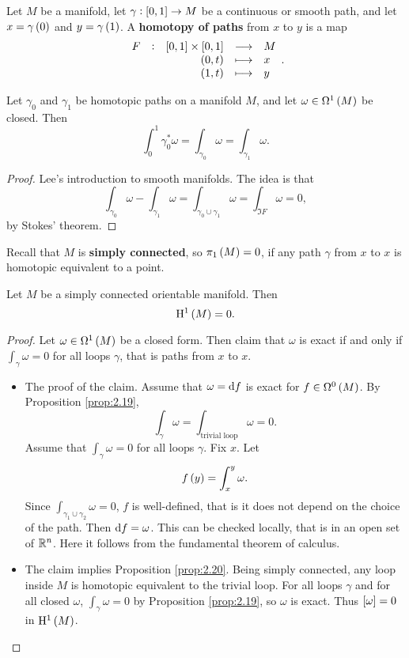 \begin{definition}
Let $ M $ be a manifold, let $ \gamma : \sbr{0, 1} \to M $ be a continuous or smooth path, and let $ x = \gamma\br{0} $ and $ y = \gamma\br{1} $. A \textbf{homotopy of paths} from $ x $ to $ y $ is a map
$$ \functions[F]{\sbr{0, 1} \times \sbr{0, 1}}{M}{\br{0, t}}{x}{\br{1, t}}{y}. $$
\end{definition}

\begin{proposition}
\label{prop:2.19}
Let $ \gamma_0 $ and $ \gamma_1 $ be homotopic paths on a manifold $ M $, and let $ \omega \in \Omega^1\br{M} $ be closed. Then
$$ \int_0^1 \gamma_0^*\omega = \int_{\gamma_0} \omega = \int_{\gamma_1} \omega. $$
\end{proposition}

\begin{proof}
Lee's introduction to smooth manifolds. The idea is that
$$ \int_{\gamma_0} \omega - \int_{\gamma_1} \omega = \int_{\gamma_0 \cup \gamma_1} \omega = \int_{\Im F} \omega = 0, $$
by Stokes' theorem.
\end{proof}

Recall that $ M $ is \textbf{simply connected}, so $ \pi_1\br{M} = 0 $, if any path $ \gamma $ from $ x $ to $ x $ is homotopic equivalent to a point.

\begin{proposition}
\label{prop:2.20}
Let $ M $ be a simply connected orientable manifold. Then
$$ \H^1\br{M} = 0. $$
\end{proposition}

\begin{proof}
Let $ \omega \in \Omega^1\br{M} $ be a closed form. Then claim that $ \omega $ is exact if and only if $ \int_\gamma \omega = 0 $ for all loops $ \gamma $, that is paths from $ x $ to $ x $.
\begin{itemize}
\item The proof of the claim. Assume that $ \omega = \mathrm{d} f $ is exact for $ f \in \Omega^0\br{M} $. By Proposition \ref{prop:2.19},
$$ \int_\gamma \omega = \int_{\text{trivial loop}} \omega = 0. $$
Assume that $ \int_\gamma \omega = 0 $ for all loops $ \gamma $. Fix $ x $. Let
$$ f\br{y} = \int_x^y \omega. $$
Since $ \int_{\gamma_1 \cup \gamma_2} \omega = 0 $, $ f $ is well-defined, that is it does not depend on the choice of the path. Then $ \mathrm{d} f = \omega $. This can be checked locally, that is in an open set of $ \mathbb{R}^n $. Here it follows from the fundamental theorem of calculus.
\item The claim implies Proposition \ref{prop:2.20}. Being simply connected, any loop inside $ M $ is homotopic equivalent to the trivial loop. For all loops $ \gamma $ and for all closed $ \omega $, $ \int_\gamma \omega = 0 $ by Proposition \ref{prop:2.19}, so $ \omega $ is exact. Thus $ \sbr{\omega} = 0 $ in $ \H^1\br{M} $.
\end{itemize}
\end{proof}

